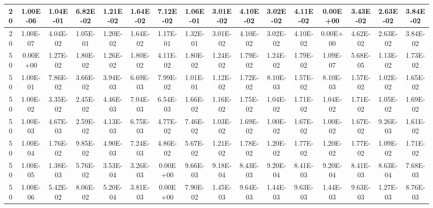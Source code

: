 \begin{table}[H]
\begin{center}
{\begin{tabular}{|c|c|c|c|c|c|c|c|c|c|c|c|c|c|c|c|}
20    &    1.00E-06    &    1.04E-01    &    6.82E-02    &    1.21E-02    &    1.64E-02    &    7.12E-02    &    1.06E-01    &    3.01E-02    &    4.10E-02    &    3.02E-02    &    4.11E-02    &    0.00E+00    &    3.43E-02    &    2.63E-02    &    3.84E-02    \\ \hline
20    &    1.00E-07    &    4.04E-02    &    1.05E-01    &    1.20E-02    &    1.64E-02    &    1.17E-01    &    1.32E-01    &    3.01E-02    &    4.10E-02    &    3.02E-02    &    4.10E-02    &    0.00E+00    &    4.62E-02    &    2.63E-02    &    3.84E-02    \\ \hline
50    &    0.00E+00    &    1.27E-02    &    1.80E-02    &    1.26E-02    &    1.80E-02    &    4.11E-02    &    1.80E-02    &    1.24E-02    &    1.79E-02    &    1.24E-02    &    1.79E-02    &    1.09E-07    &    5.68E-05    &    1.13E-02    &    1.73E-02    \\ \hline
50    &    1.00E-01    &    7.86E-02    &    3.66E-02    &    3.94E-03    &    6.69E-03    &    7.99E-02    &    1.01E-01    &    1.12E-02    &    1.72E-02    &    8.10E-03    &    1.57E-02    &    8.10E-03    &    1.57E-02    &    1.02E-02    &    1.65E-02    \\ \hline
50    &    1.00E-02    &    3.35E-02    &    2.45E-02    &    4.46E-03    &    7.04E-03    &    6.54E-03    &    1.66E-02    &    1.16E-02    &    1.75E-02    &    1.04E-02    &    1.71E-02    &    1.04E-02    &    1.71E-02    &    1.05E-02    &    1.69E-02    \\ \hline
50    &    1.00E-03    &    4.67E-03    &    2.59E-02    &    4.13E-03    &    6.75E-03    &    4.77E-02    &    7.46E-02    &    1.03E-02    &    1.69E-02    &    1.00E-02    &    1.67E-02    &    1.00E-02    &    1.67E-02    &    9.26E-03    &    1.61E-02    \\ \hline
50    &    1.00E-04    &    1.76E-02    &    9.85E-02    &    4.90E-03    &    7.24E-03    &    4.86E-02    &    5.67E-02    &    1.21E-02    &    1.78E-02    &    1.20E-02    &    1.77E-02    &    1.20E-02    &    1.77E-02    &    1.09E-02    &    1.71E-02    \\ \hline
50    &    1.00E-05    &    1.38E-03    &    5.76E-02    &    3.53E-04    &    3.26E-03    &    0.00E+00    &    9.66E-03    &    9.18E-04    &    8.43E-03    &    9.20E-04    &    8.41E-03    &    9.20E-04    &    8.41E-03    &    8.63E-04    &    7.68E-03    \\ \hline
50    &    1.00E-06    &    5.42E-02    &    8.06E-02    &    5.20E-04    &    3.81E-03    &    0.00E+00    &    7.90E-02    &    1.45E-03    &    9.64E-03    &    1.44E-03    &    9.63E-03    &    1.44E-03    &    9.63E-03    &    1.27E-03    &    8.76E-03    \\ \hline

\end{tabular}}
\end{center}
\end{table}
